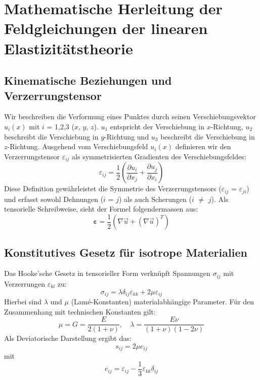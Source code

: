 %
%
%
%
\section{Mathematische Herleitung der Feldgleichungen der linearen Elastizitätstheorie}
\label{elastomechanik:section:herleitung2}
\subsection{Kinematische Beziehungen und Verzerrungstensor}
Wir beschreiben die Verformung eines Punktes durch seinen Verschiebungsvektor $u_i(x)$ mit $i$ = 1,2,3 ($x$, $y$, $z$).
$u_1$ entspricht der Verschiebung in $x$-Richtung, $u_2$ beschreibt die Verschiebung in $y$-Richtung und $u_3$ beschreibt die Verschiebung in $z$-Richtung.
Ausgehend vom Verschiebungsfeld $u_i(x)$ definieren wir den Verzerrungstensor $\varepsilon_{ij}$ als symmetrisierten Gradienten des Verschiebungsfeldes:
	\begin{equation}
		\varepsilon_{ij} = 
		\frac{1}{2} \left( \frac{\partial u_i}{\partial x_j} + \frac{\partial u_j}{\partial x_i} \right)
	\end{equation}
Diese Definition gewährleistet die Symmetrie des Verzerrungstensors ($\varepsilon_{ij}$ = $\varepsilon_{ji}$) und erfasst sowohl Dehnungen ($i$ = $j$) als auch Scherungen ($i$ $\neq$ $j$).
Als tensorielle Schreibweise, sieht der Formel folgendermassen aus:
	\begin{equation}
		\boldsymbol{\varepsilon} = 
		\frac{1}{2} \left( \nabla \vec{u} + (\nabla \vec{u})^T \right)
	\end{equation}

\subsection{Konstitutives Gesetz für isotrope Materialien}
Das Hooke'sche Gesetz in tensorieller Form verknüpft Spannungen $\sigma_{ij}$ mit Verzerrungen $\varepsilon_{kl}$ zu:
	\begin{equation}
		\sigma_{ij} = 
	\lambda \delta_{ij} \varepsilon_{kk} + 2\mu \varepsilon_{ij}
	\end{equation}
Hierbei sind $\lambda$ und $\mu$ (Lamé-Konstanten) materialabhängige Parameter. Für den Zusammenhang mit technischen Konstanten gilt:
	\begin{equation}
		\mu = 
		G = 
		\frac{E}{2(1+\nu)}, \quad \lambda = 
		\frac{E \nu}{(1+\nu)(1-2\nu)}
	\end{equation}	
Als Deviatorische Darstellung ergibt das:
	\begin{equation}
		s_{ij} =
		2\mu e_{ij}
	\end{equation}
mit
	\begin{equation}
		e_{ij} = 
		\varepsilon_{ij} - \frac{1}{3} \varepsilon_{kk} \delta_{ij}
	\end{equation}

